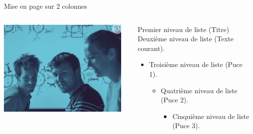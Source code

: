 \begin{frame}{Mise en page sur 2 colonnes}
   \begin{columns}
       
       \begin{column}[t]{0.45\textwidth}
           \begin{center}
           \includegraphics[width=0.95\textwidth]{imgs/photo.png}      
           \end{center}
       \end{column}
         
     \begin{column}[t]{0.45\textwidth}
 
            \begin{block}{Premier niveau de liste (Titre)}
            Deuxième niveau de liste (Texte courant).
              \begin{itemize}
                \item Troisième niveau de liste (Puce 1).
                    \begin{itemize}
                      \item Quatrième niveau de liste (Puce 2).
                         \begin{itemize}
                            \item Cinquième niveau de liste (Puce 3).
                         \end{itemize}
                    \end{itemize}
              \end{itemize}
            \end{block}
 

\end{column}
\end{columns}
\end{frame}
